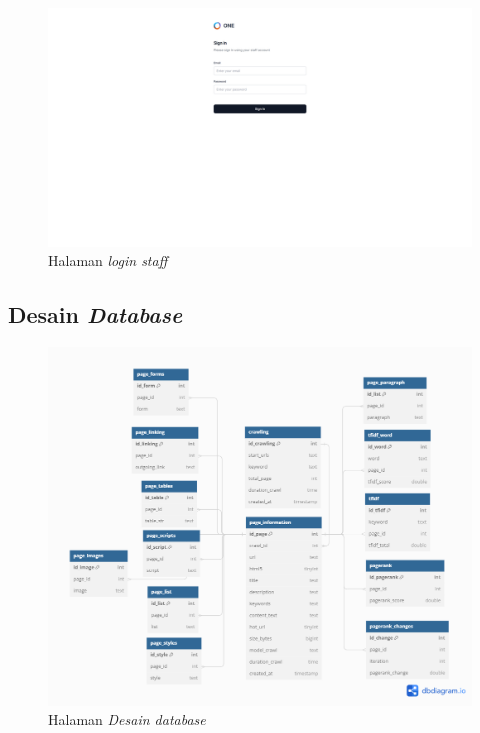 \documentclass[
	a4paper, %
	10pt, %
	unnumberedsections, %
	twoside, %
]{LTJournalArticle}
\begin{document}
\begin{figure}[H]
\includegraphics[width=\linewidth]{view_staff_login.png}
\caption{Halaman \textit{login staff}}
\label{gambar:staff_login}
\end{figure}

\subsection{Desain \textit{Database}}

\begin{figure}[H]
	\includegraphics[width=\linewidth]{erd.png}
	\caption{Halaman \textit{Desain \textit{database}}}
	\label{gambar:desain_database}
\end{figure}
\end{document}

